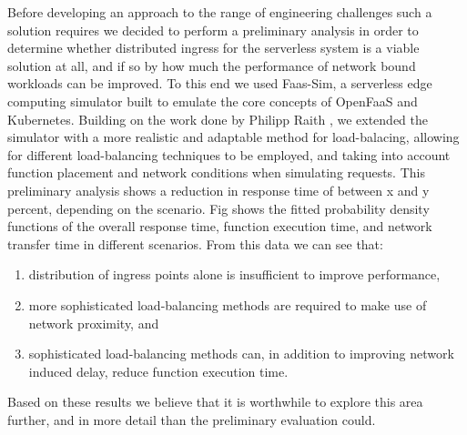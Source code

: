 Before developing an approach to the range of engineering challenges such a solution requires we decided to perform a preliminary analysis in order to determine whether distributed ingress for the serverless system is a viable solution at all, and if so by how much the performance of network bound workloads can be improved.
To this end we used Faas-Sim, %
a serverless edge computing simulator built to emulate the core concepts of OpenFaaS and Kubernetes. Building on the work done by Philipp Raith ,%
we extended the simulator with a more realistic and adaptable method for load-balacing, allowing for different load-balancing techniques to be employed, and taking into account function placement and network conditions when simulating requests.%
This preliminary analysis shows a reduction in response time of between x and y percent, depending on the scenario. Fig %
shows the fitted probability density functions of the overall response time, function execution time, and network transfer time in different scenarios. From this data we can see that:
\begin{enumerate}
    \item distribution of ingress points alone is insufficient to improve performance,
    \item more sophisticated load-balancing methods are required to make use of network proximity, and
    \item sophisticated load-balancing methods can, in addition to improving network induced delay, reduce function execution time.
\end{enumerate}
Based on these results we believe that it is worthwhile to explore this area further, and in more detail than the preliminary evaluation could.

